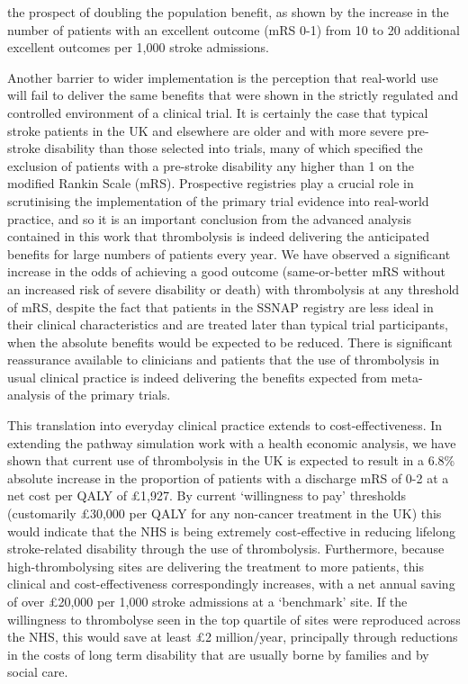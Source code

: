 the prospect of doubling the population benefit, as shown by the increase in the number of patients with an excellent outcome (mRS 0-1) from 10 to 20 additional excellent outcomes per 1,000 stroke admissions.

Another barrier to wider implementation is the perception that real-world use will fail to deliver the same benefits that were shown in the strictly regulated and controlled environment of a clinical trial. It is certainly the case that typical stroke patients in the UK and elsewhere are older and with more severe pre-stroke disability than those selected into trials, many of which specified the exclusion of patients with a pre-stroke disability any higher than 1 on the modified Rankin Scale (mRS). Prospective registries play a crucial role in scrutinising the implementation of the primary trial evidence into real-world practice, and so it is an important conclusion from the advanced analysis contained in this work that thrombolysis is indeed delivering the anticipated benefits for large numbers of patients every year. We have observed a significant increase in the odds of achieving a good outcome (same-or-better mRS without an increased risk of severe disability or death) with thrombolysis at any threshold of mRS, despite the fact that patients in the SSNAP registry are less ideal in their clinical characteristics and are treated later than typical trial participants, when the absolute benefits would be expected to be reduced. There is significant reassurance available to clinicians and patients that the use of thrombolysis in usual clinical practice is indeed delivering the benefits expected from meta-analysis of the primary trials.

This translation into everyday clinical practice extends to cost-effectiveness. In extending the pathway simulation work with a health economic analysis, we have shown that current use of thrombolysis in the UK is expected to result in a 6.8\% absolute increase in the proportion of patients with a discharge mRS of 0-2 at a net cost per QALY of £1,927. By current ‘willingness to pay’ thresholds (customarily £30,000 per QALY for any non-cancer treatment in the UK) this would indicate that the NHS is being extremely cost-effective in reducing lifelong stroke-related disability through the use of thrombolysis. Furthermore, because high-thrombolysing sites are delivering the treatment to more patients, this clinical and cost-effectiveness correspondingly increases, with a net annual saving of over £20,000 per 1,000 stroke admissions at a ‘benchmark’ site. If the willingness to thrombolyse seen in the top quartile of sites were reproduced across the NHS, this would save at least £2 million/year, principally through reductions in the costs of long term disability that are usually borne by families and by social care.

